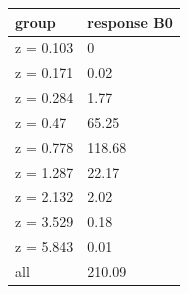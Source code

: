 \begingroup\small
\setlength{\tabcolsep}{3pt}
\renewcommand{\arraystretch}{1.04}
\begin{tabularx}{\linewidth}{XX}
\toprule
group & response B0 \\
\midrule
z = 0.103 & 0 \\
z = 0.171 & 0.02 \\
z = 0.284 & 1.77 \\
z = 0.47 & 65.25 \\
z = 0.778 & 118.68 \\
z = 1.287 & 22.17 \\
z = 2.132 & 2.02 \\
z = 3.529 & 0.18 \\
z = 5.843 & 0.01 \\
all & 210.09 \\
\bottomrule
\end{tabularx}
\endgroup
